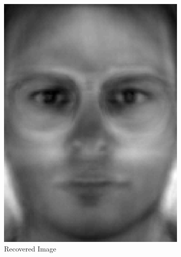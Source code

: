 \documentclass[review]{elsarticle}
\begin{document}
\begin{figure}[H]
\begin{subfigure}[b]{0.18\textwidth}
	\includegraphics[width=\linewidth]{Fig_5b}
		\caption{Recovered Image}
	\label{fig:recov_image_ex_3} \hfill
\end{subfigure}
\begin{subfigure}[b]{0.18\textwidth} 
\centering

\end{subfigure}
\end{figure}
\end{document}
